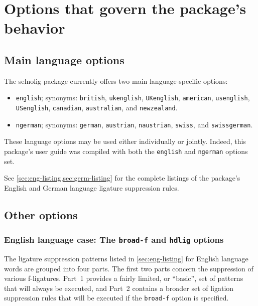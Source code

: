 \documentclass[12pt]{article}
\newcommand{\pkg}[1]{\textsf{#1}}
\newcommand{\opt}[1]{\texttt{#1}}
\begin{document}
\section{Options that govern the package's behavior}
\label{sec:options}

\subsection{Main language options}

The \pkg{selnolig} package currently offers two main language-specific options: 
\begin{itemize}
\item \opt{english}; synonyms: \opt{british}, \opt{ukenglish}, \opt{UKenglish}, \opt{amer\-ican},  \opt{usenglish}, \opt{USenglish}, \opt{cana\-dian}, \opt{australian}, and \opt{new\-zealand}.
\item \opt{ngerman}; synonyms: \opt{german}, \opt{austrian}, \opt{naustrian}, \opt{swiss}, and \opt{swiss\-german}.
\end{itemize}
These language options may be used either individually or jointly. Indeed, this package's user guide was compiled with both the \opt{english} and \opt{ngerman} options set.

See \cref{sec:eng-listing,sec:germ-listing} for the complete listings of the package's English and German language ligature suppression rules.



\subsection{Other options}

\subsubsection[English language case: The broad-f and hdlig options]{English language case: The \opt{broad-f} and \opt{hdlig} options} \label{sec:eng-opt}

The ligature suppression patterns listed in \cref{sec:eng-listing} for English language words are grouped into four parts. The first two parts concern the suppression of various f-ligatures. Part~1 provides a fairly limited, or \enquote{basic}, set of patterns that will always be executed, and Part~2 contains a broader set of ligation suppression rules that will be executed if the \opt{broad-f} option is specified. 
\end{document}
